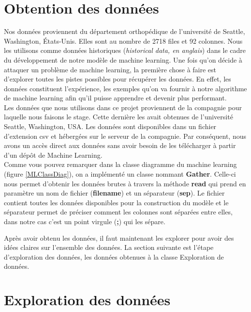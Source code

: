 \documentclass[12pt, french]{report}
\begin{document}
\section{Obtention des données}
Nos données proviennent du département orthopédique de l'université de Seattle, Washington, États-Unis. Elles sont au nombre de 2718 files et 92 colonnes. Nous les utilisons comme données historiques (\textit{historical data, en anglais}) dans le cadre du développement de notre modèle de machine learning. 
Une fois qu'on décide à attaquer un problème de machine learning, la première chose à faire est d'explorer toutes les pistes possibles pour récupérer les données. En effet, les données constituent l'expérience, les exemples qu'on va fournir à notre algorithme de machine learning afin qu'il puisse apprendre et devenir plus performant.\\ 

Les données que nous utilisons dans ce projet proviennent de la compagnie pour laquelle nous faisons le stage. Cette dernière les avait obtenues de l'université Seattle, Washington, USA. Les données sont disponibles dans un fichier d'extension csv et hébergées sur le serveur de la compagnie. Par conséquent, nous avons un accès direct aux données sans avoir besoin de les télécharger à partir d'un dépôt de Machine Learning. \\

Comme vous pouvez remarquer dans la classe diagramme du machine learning (figure \ref{MLClassDiag}), on a implémenté un classe nommant \textbf{Gather}. Celle-ci nous permet d'obtenir les données brutes à travers la méthode \textbf{read} qui prend en paramètre un nom de fichier (\textbf{filename}) et un séparateur (\textbf{sep}). Le fichier contient toutes les données disponibles pour la construction du modèle et le séparateur permet de préciser comment les colonnes sont séparées entre elles, dans notre cas c'est un point virgule (\textbf{;}) qui les sépare.

Après avoir obtenu les données, il faut maintenant les explorer pour avoir des idées claires sur l'ensemble des données. La section suivante est l'étape d'exploration des données, les données obtenues à la classe Exploration de données. 

\section{Exploration des données}
\end{document}
